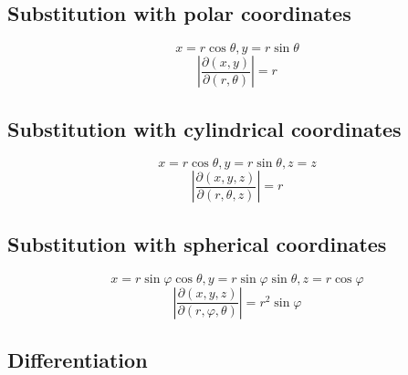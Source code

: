 	\subsection{Substitution with polar coordinates}
	$$x=r\cos\theta,y=r\sin\theta$$
	$$\left|\frac{\partial(x,y)}{\partial(r,\theta)}\right|=r$$
	\subsection{Substitution with cylindrical coordinates}
	$$x=r\cos\theta,y=r\sin\theta,z=z$$
	$$\left|\frac{\partial(x,y,z)}{\partial(r,\theta,z)}\right|=r$$
	\subsection{Substitution with spherical coordinates}
	$$x=r\sin\varphi\cos\theta,y=r\sin\varphi\sin\theta,z=r\cos\varphi$$
	$$\left|\frac{\partial(x,y,z)}{\partial(r,\varphi,\theta)}\right|=r^2\sin\varphi$$

\subsection{Differentiation}
	\def\sinh{\mathop{\rm sinh}\nolimits}
	\def\cosh{\mathop{\rm cosh}\nolimits}
	\def\sech{\mathop{\rm sech}\nolimits}
	\def\csch{\mathop{\rm csch}\nolimits}
	\def\coth{\mathop{\rm coth}\nolimits}
	\def\tanh{\mathop{\rm tanh}\nolimits}

